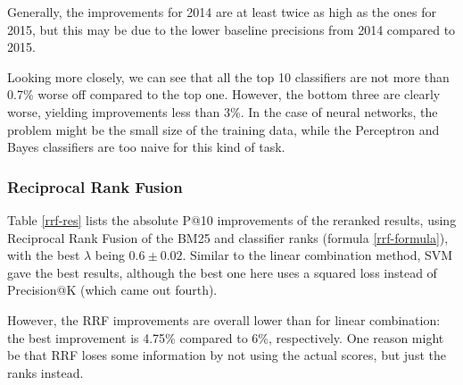 Generally, the improvements for 2014 are at least 
twice as high as the ones for 2015, but this may be due to the lower baseline precisions from 2014 compared to 2015.

Looking more closely, we can see that all the top 10 classifiers are not more than 0.7\% worse off compared to the top one. However, the bottom three
are clearly worse, yielding improvements less than 3\%. In the case of neural networks, the problem might be the small size of the training data,
while the Perceptron and Bayes classifiers are too naive for this kind of task.

\subsubsection{Reciprocal Rank Fusion}
Table \ref{rrf-res} lists the absolute P@10 improvements of the reranked results, using Reciprocal Rank Fusion of the BM25 and classifier ranks (formula \ref{rrf-formula}),
with the best $\lambda$ being $0.6\pm 0.02$.
Similar to the linear combination method, SVM gave the best results, although the best one here uses a squared loss instead of 
Precision@K (which came out fourth).

However, the RRF improvements are overall lower than for linear combination: the best improvement is 4.75\% compared to 6\%, respectively. One reason
might be that RRF loses some information by not using the actual scores, but just the ranks instead.

